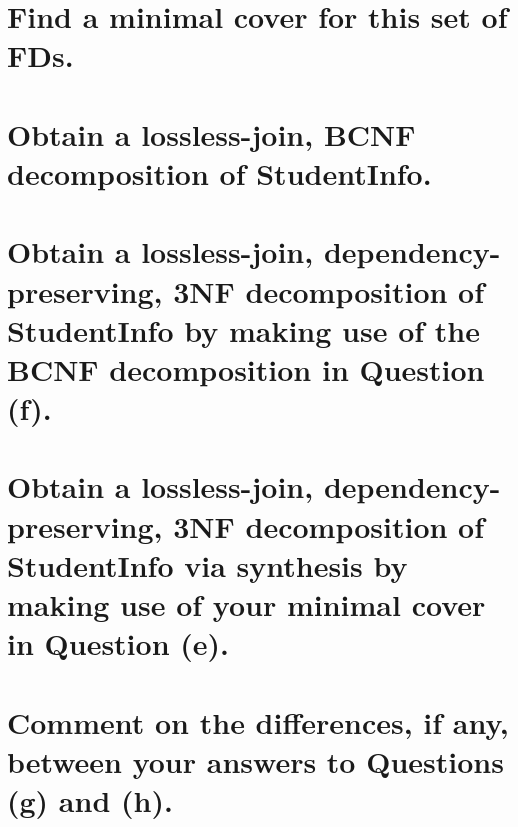 \documentclass{article}
\begin{document}
\section{Find a minimal cover for this set of FDs.}

\section{Obtain a lossless-join, BCNF decomposition of StudentInfo.}

\section{Obtain a lossless-join, dependency-preserving, 3NF decomposition of StudentInfo by
making use of the BCNF decomposition in Question (f).}

\section{Obtain a lossless-join, dependency-preserving, 3NF decomposition of StudentInfo via
synthesis by making use of your minimal cover in Question (e).}

\section{Comment on the differences, if any, between your answers to Questions (g) and (h).}
\end{document}
